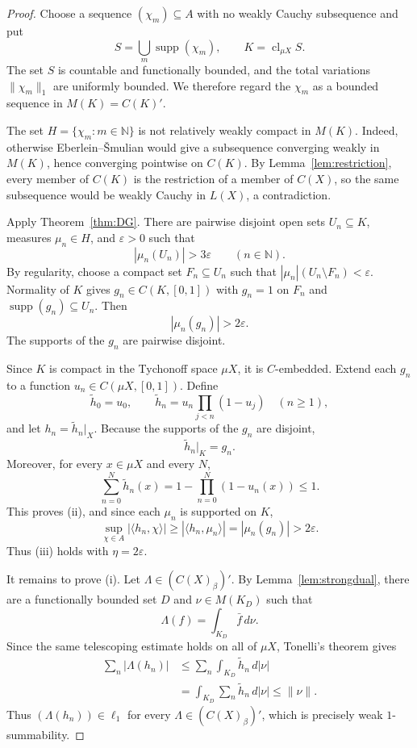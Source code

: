 \documentclass[11pt]{article}
\newcommand{\N}{\mathbb N}
\newcommand{\supp}{\operatorname{supp}}
\newcommand{\cl}{\operatorname{cl}}
\begin{document}
\begin{proof}
Choose a sequence $(\chi_m)\subseteq A$ with no weakly Cauchy subsequence and
put
\[
  S=\bigcup_m\supp(\chi_m),
  \qquad K=\cl_{\mu X}S.
\]
The set $S$ is countable and functionally bounded, and the total variations
$\|\chi_m\|_1$ are uniformly bounded.  We therefore regard the $\chi_m$ as a
bounded sequence in $M(K)=C(K)'$.

The set $H=\{\chi_m:m\in\N\}$ is not relatively weakly compact in $M(K)$.
Indeed, otherwise Eberlein--\v Smulian would give a subsequence converging weakly
in $M(K)$, hence converging pointwise on $C(K)$.  By
Lemma~\ref{lem:restriction}, every member of $C(K)$ is the restriction of a
member of $C(X)$, so the same subsequence would be weakly Cauchy in $L(X)$, a
contradiction.

Apply Theorem~\ref{thm:DG}.  There are pairwise disjoint open sets
$U_n\subseteq K$, measures $\mu_n\in H$, and $\varepsilon>0$ such that
\[
  |\mu_n(U_n)|>3\varepsilon
  \qquad(n\in\N).
\]
By regularity, choose a compact set $F_n\subseteq U_n$ such that
$|\mu_n|(U_n\setminus F_n)<\varepsilon$.  Normality of $K$ gives
$g_n\in C(K,[0,1])$ with $g_n=1$ on $F_n$ and
$\supp(g_n)\subseteq U_n$.  Then
\[
  |\mu_n(g_n)|>2\varepsilon.
\]
The supports of the $g_n$ are pairwise disjoint.

Since $K$ is compact in the Tychonoff space $\mu X$, it is $C$-embedded.
Extend each $g_n$ to a function $u_n\in C(\mu X,[0,1])$.  Define
\[
  \widetilde h_0=u_0,
  \qquad
  \widetilde h_n=u_n\prod_{j<n}(1-u_j)
  \quad(n\geq1),
\]
and let $h_n=\widetilde h_n|_X$.  Because the supports of the $g_n$ are
disjoint,
\[
  \widetilde h_n|_K=g_n.
\]
Moreover, for every $x\in\mu X$ and every $N$,
\[
  \sum_{n=0}^N\widetilde h_n(x)
  =1-\prod_{n=0}^N(1-u_n(x))\leq1.
\]
This proves (ii), and since each $\mu_n$ is supported on $K$,
\[
  \sup_{\chi\in A}|\langle h_n,\chi\rangle|
  \geq|\langle h_n,\mu_n\rangle|
  =|\mu_n(g_n)|>2\varepsilon.
\]
Thus (iii) holds with $\eta=2\varepsilon$.

It remains to prove (i).  Let $\Lambda\in(C(X)_\beta)'$.  By
Lemma~\ref{lem:strongdual}, there are a functionally bounded set $D$ and
$\nu\in M(K_D)$ such that
\[
  \Lambda(f)=\int_{K_D}\bar f\,d\nu.
\]
Since the same telescoping estimate holds on all of $\mu X$, Tonelli's theorem
gives
\[
\begin{split}
  \sum_n|\Lambda(h_n)|
  &\leq\sum_n\int_{K_D}\widetilde h_n\,d|\nu|\\
  &=\int_{K_D}\sum_n\widetilde h_n\,d|\nu|
  \leq\|\nu\|.
\end{split}
\]
Thus $(\Lambda(h_n))\in\ell_1$ for every
$\Lambda\in(C(X)_\beta)'$, which is precisely weak $1$-summability.
\end{proof}
\end{document}
